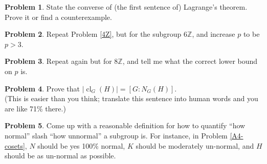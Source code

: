 \documentclass[12pt]{article}
\theoremstyle{definition} %
\newtheorem{problem}{Problem}
\newcommand{\Z}{\mathbb{Z}}
\begin{document}
\begin{problem}
    State the converse of (the first sentence of) Lagrange's theorem. Prove it or find a counterexample. 
\end{problem}

\begin{problem}
    Repeat Problem \ref{4Z}, but for the subgroup $6\Z$, and increase $p$ to be $p > 3$. 
\end{problem}
\begin{problem}
    Repeat again but for $8\Z$, and tell me what the correct lower bound on $p$ is.
\end{problem}
\begin{problem}
    Prove that $|\operatorname{cl}_G(H)| = [G:N_G(H)]$. \\
    (This is easier than you think; translate this sentence into human words and you are like 71\% there.)
\end{problem}
\begin{problem}
    Come up with a reasonable definition for how to quantify ``how normal'' slash ``how unnormal'' a subgroup is. For instance, in Problem \ref{A4-cosets}, $N$ should be yes 100\% normal, $K$ should be moderately un-normal, and $H$ should be as un-normal as possible.
\end{problem}
\end{document}
